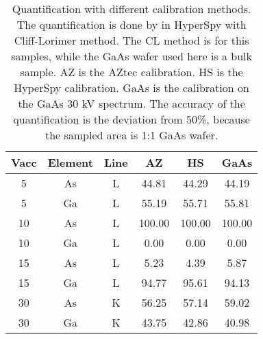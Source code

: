 



\begin{table}[ht]
    \centering
    \caption{
        Quantification with different calibration methods.
        The quantification is done by in HyperSpy with Cliff-Lorimer method.
        The CL method is for this samples, while the GaAs wafer used here is a bulk sample.
        AZ is the AZtec calibration.
        HS is the HyperSpy calibration.
        GaAs is the calibration on the GaAs 30 kV spectrum.
        The accuracy of the quantification is the deviation from 50\%, because the sampled area is 1:1 GaAs wafer.
    }
    \label{tab:results:calibration-quantification}
    \begin{tabular}{cccccc}
        Vacc & Element & Line & AZ     & HS     & GaAs   \\
        \hline
        5    & As      & L    & 44.81  & 44.29  & 44.19  \\
        5    & Ga      & L    & 55.19  & 55.71  & 55.81  \\
        10   & As      & L    & 100.00 & 100.00 & 100.00 \\
        10   & Ga      & L    & 0.00   & 0.00   & 0.00   \\
        15   & As      & L    & 5.23   & 4.39   & 5.87   \\
        15   & Ga      & L    & 94.77  & 95.61  & 94.13  \\
        30   & As      & K    & 56.25  & 57.14  & 59.02  \\
        30   & Ga      & K    & 43.75  & 42.86  & 40.98
    \end{tabular}
\end{table}